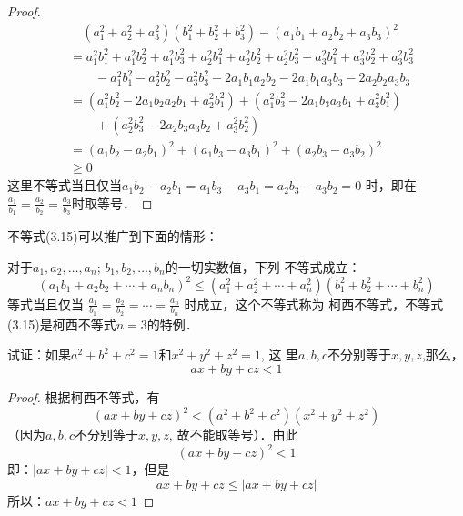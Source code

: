 \begin{proof}
    \[\begin{split}
&\quad   (a_1^2+a_2^2+a_3^2)(b_1^2+b_2^2+b_3^2)-(a_1b_1+a_2b_2+a_3b_3)^2\\
 & = a_1^2b_1^2+a_1^2b_2^2+a_1^2b_3^2
    +a_2^2b_1^2+a_2^2b_2^2+a_2^2b_3^2
    +a_3^2b_1^2+a_3^2b_2^2+a_3^2b_3^2\\
  &\qquad  - a_1^2b_1^2-a_2^2b^2_2-a_3^2b_3^2
    -2a_1b_1a_2b_2-2a_1b_1a_3b_3-2a_2b_2a_3b_3\\
    & = (a_1^2b_2^2-2a_1b_2a_2b_1+a_2^2b_1^2)
    +(a_1^2b_3^2-2a_1b_3a_3b_1+a_3^2b_1^2)\\
    &\qquad     +(a_2^2b_3^2-2a_2b_3a_3b_2+a_3^2b_2^2)\\
    & = (a_1b_2 -a_2b_1)^2+(a_1b_3-a_3b_1)^2+(a_2b_3-a_3b_2)^2\\
    & \ge 0        
    \end{split}\]
    这里不等式当且仅当$a_1b_2 -a_2b_1=a_1b_3-a_3b_1=a_2b_3-a_3b_2=0$   
    时，即在$\frac{a_1}{b_1}=\frac{a_2}{b_2}=\frac{a_3}{b_3}$时取等号． 
\end{proof}

不等式(3.15)可以推广到下面的情形：

\begin{blk}{}
    对于$a_1,a_2,\ldots,a_n$; $b_1,b_2,\ldots,b_n$的一切实数值，下列
    不等式成立：
    \[(a_1b_1+a_2b_2+\cdots+a_nb_n)^2\le (a_1^2+a_2^2+\cdots+a_n^2)(b_1^2+b_2^2+\cdots+b_n^2)\]
    等式当且仅当
    $\frac{a_1}{b_1}=\frac{a_2}{b_2}=\cdots=\frac{a_n}{b_n}$
    时成立，这个不等式称为
    柯西不等式，不等式(3.15)是柯西不等式$n=3$的特例．
\end{blk}



\begin{example}
    试证：如果$a^2+b^2+c^2=1$和$x^2+y^2+z^2=1$, 这
里$a,b,c$不分别等于$x,y,z$,那么，
\[ax+by+cz<1\]
\end{example}

\begin{proof}
根据柯西不等式，有
\[(ax+by+cz)^2<(a^2+b^2+c^2)(x^2+y^2+z^2)\]
（因为$a,b,c$不分别等于$x,y,z$, 故不能取等号）．由此
\[(ax+by+cz)^2<1\]
即：$|ax+by+cz|<1$，但是
\[ax+by+cz\le |ax+by+cz|\]
所以：$ax+by+cz<1$
\end{proof}

